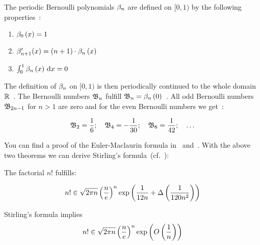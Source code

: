 The periodic Bernoulli polynomials $\bps$ are defined on $[0,1)$ by the following properties~\cite[p. 291]{koenigsberger}:

\begin{enumerate}
  \item $\bp[0]{x} = 1$
  \item $\bps[n+1]'(x) = (n+1)\cdot \bp{x}$
  \item $\int_0^1 \bp{x} \d{x} = 0$
\end{enumerate}

The definition of $\bps$ on $[0,1)$ is then periodically continued to the whole domain $\R$~\cite[pp.~225, 291]{koenigsberger}. The Bernoulli numbers $\bn$ fulfill $\bn=\bp{0}$~\cite[p.~290]{koenigsberger}. All odd Bernoulli numbers $\bn[2n-1]$ for $n>1$ are zero and for the even Bernoulli numbers we get~\cite[p.~289]{koenigsberger}:

\begin{align}
  \bn[2] = \frac 16;\quad \bn[4]=-\frac{1}{30};\quad \bn[6]=\frac{1}{42};\quad \ldots
\end{align}

You can find a proof of the Euler-Maclaurin formula in~\cite[pp.~225-226]{koenigsberger} and~\cite[pp.~506-509]{heuser}. With the above two theorems we can derive Stirling's formula~(cf.~\cite[p.~228]{koenigsberger}):

\begin{theorem}
  The factorial $n!$ fulfills:

  \begin{align}
    n! \in \sqrt{2\pi n} \left(\frac ne\right)^n \fexp{\frac 1{12n} + \bigabs{\frac{1}{120n^2}} }
  \end{align}
\end{theorem}

\begin{remark}
  Stirling's formula implies
  \begin{align}
     n! \in \sqrt{2\pi n} \left(\frac ne\right)^n \fexp{\bigo{\frac 1n}}
  \end{align}
\end{remark}

